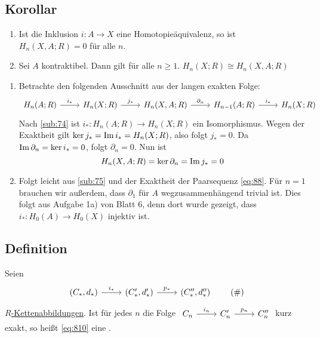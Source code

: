 \subsection[Korollar: Hologiemodul wenn $A$ kontraktibel ist]{Korollar} %
\label{sub:89}
\begin{enumerate}[(1)]
	\item Ist die Inklusion $i \colon A \to X$ eine Homotopieäquivalenz, so ist $H_n(X,A;R)= 0$ für alle $n$.
	\item Sei $A$ kontraktibel. Dann gilt für alle $n \ge 1$. $H_n(X;R) \cong H_n(X,A;R)$
\end{enumerate}
\begin{enumerate}[(1)]
	\item Betrachte den folgenden Ausschnitt aus der langen exakten Folge:
	\[
		\begin{tikzcd}
			H_n(A;R) \rar["i_*"] & H_n(X;R) \rar["j_*"] & H_n(X,A;R) \rar["\partial_n"] & H_{n-1}(A;R) \rar["i_*"] & H_n(X;R)
		\end{tikzcd}
	\]
	Nach \ref{sub:74} ist $i_* \colon H_n(A;R) \to H_n(X;R)$ ein Isomorphismus. Wegen der Exaktheit gilt
	$\ker j_* = \operatorname{Im} i_* = H_n(X;R)$, also folgt $j_* = 0$. Da $\operatorname{Im} \partial_n = \ker i_* = 0$, folgt $\partial_n=0$. Nun ist 
	\[
		H_n(X,A;R) = \ker \partial_n = \operatorname{Im} j_* = 0
	\]
	\item Folgt leicht aus \ref{sub:75} und der Exaktheit der Paarsequenz \eqref{eq:88}. Für $n=1$ brauchen wir außerdem, dass $\partial_1$ für $A$ wegzusammenhängend
	trivial ist. Dies folgt aus Aufgabe 1a) von Blatt 6, denn dort wurde gezeigt, dass $i_* \colon H_0(A) \to H_0(X)$ injektiv ist. \bewende
\end{enumerate}

\subsection[Definition: Kurze exakte Folge von Kettenkomplexen]{Definition} %
\label{sub:810}
Seien 
\begin{equation*}
	\begin{tikzcd}
		(C_*,d_*) \rar["i_*"] & (C_*',d_*') \rar["p_*"] & (C_*'',d_*'') 
	\end{tikzcd} \label{eq:810}\tag{\#}
\end{equation*}
\hyperref[sub:61]{$R$-Kettenabbildungen}. Ist für jedes $n$ die Folge
\(
	\begin{tikzcd}
		C_n \rar["i_n"] & C_n' \rar["p_n"] & C_n''
	\end{tikzcd}
\)
kurz exakt, so heißt \eqref{eq:810} eine .

